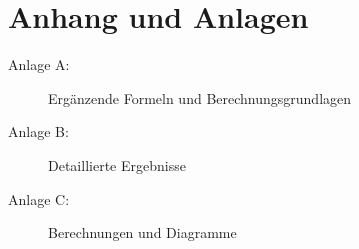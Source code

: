 \cleardoublepage
\appendix
{}
\chapter*{Anhang und Anlagen}

\begin{description}
\item[Anlage A:] Ergänzende Formeln und Berechnungsgrundlagen\hfill \\
\item[Anlage B:] Detaillierte Ergebnisse \hfill \\
\item[Anlage C:] Berechnungen und Diagramme\hfill \\
\end{description}

